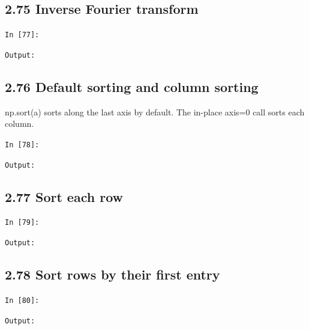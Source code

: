 \documentclass[11pt]{article}
\begin{document}
\par\medskip\noindent\begin{minipage}{\linewidth}
\subsection*{2.75 Inverse Fourier transform}
\noindent\texttt{In [77]:}

\noindent\texttt{Output:}

\end{minipage}\par

\par\medskip\noindent\begin{minipage}{\linewidth}
\subsection*{2.76 Default sorting and column sorting}
np.sort(a) sorts along the last axis by default. The in-place axis=0 call sorts each column.

\noindent\texttt{In [78]:}

\noindent\texttt{Output:}

\end{minipage}\par

\par\medskip\noindent\begin{minipage}{\linewidth}
\subsection*{2.77 Sort each row}
\noindent\texttt{In [79]:}

\noindent\texttt{Output:}

\end{minipage}\par

\par\medskip\noindent\begin{minipage}{\linewidth}
\subsection*{2.78 Sort rows by their first entry}
\noindent\texttt{In [80]:}

\noindent\texttt{Output:}

\end{minipage}\par
\end{document}
